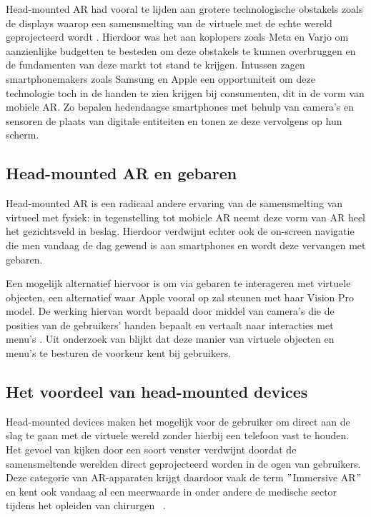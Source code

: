 Head-mounted AR had vooral te lijden aan grotere technologische obstakels zoals de displays waarop een samensmelting van de virtuele met de echte wereld geprojecteerd wordt \autocite{YunHan2018} .
Hierdoor was het aan koplopers zoals Meta en Varjo om aanzienlijke budgetten te besteden om deze obstakels te kunnen overbruggen en de fundamenten van deze markt tot stand te krijgen. %
Intussen zagen smartphonemakers zoals Samsung en Apple een opportuniteit om deze technologie toch in de handen te zien krijgen bij consumenten, dit in de vorm van mobiele AR.
Zo bepalen hedendaagse smartphones met behulp van camera's en sensoren de plaats van digitale entiteiten en tonen ze deze vervolgens op hun scherm.

\subsection{Head-mounted AR en gebaren}
\label{subsec:ar-gestures}
Head-mounted AR is een radicaal andere ervaring van de samensmelting van virtueel met fysiek: in tegenstelling tot mobiele AR neemt deze vorm van AR heel het gezichtsveld in beslag.
Hierdoor verdwijnt echter ook de on-screen navigatie die men vandaag de dag gewend is aan smartphones en wordt deze vervangen met gebaren.

Een mogelijk alternatief hiervoor is om via gebaren te interageren met virtuele objecten, een alternatief waar Apple vooral op zal steunen met haar Vision Pro model.
De werking hiervan wordt bepaald door middel van camera's die de posities van de gebruikers' handen bepaalt en vertaalt naar interacties met menu's \textcite{Shrestha2018} .
Uit onderzoek van \textcite{Datcu2013} blijkt dat deze manier van virtuele objecten en menu's te besturen de voorkeur kent bij gebruikers.

\subsection{Het voordeel van head-mounted devices}
\label{subsec:benefits-hmd}
Head-mounted devices maken het mogelijk voor de gebruiker om direct aan de slag te gaan met de virtuele wereld zonder hierbij een telefoon vast te houden.
Het gevoel van kijken door een soort venster verdwijnt doordat de samensmeltende werelden direct geprojecteerd worden in de ogen van gebruikers.
Deze categorie van AR-apparaten krijgt daardoor vaak de term \("\)Immersive AR\("\) en kent ook vandaag al een meerwaarde in onder andere de medische sector tijdens het opleiden van chirurgen~\autocite{Waisberg2023} .

